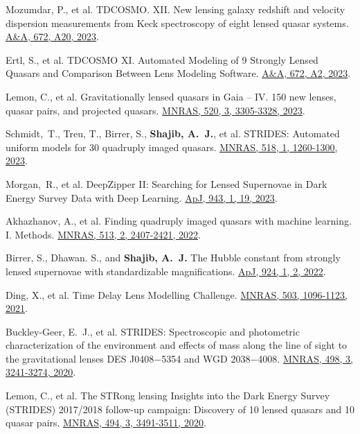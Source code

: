 \documentclass[margin, line]{res}
\begin{document}
\begin{resume}
\begin{etaremune}
	\item Mozumdar, P., et al. TDCOSMO. XII. New lensing galaxy redshift and velocity dispersion measurements from Keck spectroscopy of eight lensed quasar systems. \href{https://ui.adsabs.harvard.edu/abs/2023A\%26A...672A..20M/abstract}{A\&A, 672,  A20, 2023}.
	\item Ertl, S., et al. TDCOSMO XI. Automated Modeling of 9 Strongly Lensed Quasars and Comparison Between Lens Modeling Software. \href{https://ui.adsabs.harvard.edu/abs/2023A\%26A...672A...2E/abstract}{A\&A, 672, A2, 2023}.
	\item Lemon, C., et al. Gravitationally lensed quasars in Gaia -- IV. 150 new lenses, quasar pairs, and projected quasars. \href{https://ui.adsabs.harvard.edu/abs/2023MNRAS.520.3305L/abstract}{MNRAS, 520, 3, 3305-3328, 2023}.
	\item Schmidt,~T., Treu, T., Birrer, S., \textbf{Shajib, A.~J.}, et al. STRIDES: Automated uniform models for 30 quadruply imaged quasars. \href{https://ui.adsabs.harvard.edu/abs/2023MNRAS.518.1260S/abstract}{MNRAS, 518, 1, 1260-1300, 2023}.
	\item Morgan,~R., et al. DeepZipper II: Searching for Lensed Supernovae in Dark Energy Survey Data with Deep Learning. \href{https://ui.adsabs.harvard.edu/abs/2023ApJ...943...19M/abstract}{ApJ, 943, 1, 19, 2023}.
	\item Akhazhanov, A., et al. Finding quadruply imaged quasars with machine learning. I. Methods. \href{https://ui.adsabs.harvard.edu/abs/2022MNRAS.tmp..904A/abstract}{MNRAS, 513, 2, 2407-2421, 2022}.
	\item Birrer, S., Dhawan. S., and \textbf{Shajib, A.~J.} The Hubble constant from strongly lensed supernovae with standardizable magnifications. \href{https://iopscience.iop.org/article/10.3847/1538-4357/ac323a}{ApJ, 924, 1, 2, 2022}.
	\item Ding, X., et al. Time Delay Lens Modelling Challenge. \href{https://ui.adsabs.harvard.edu/abs/2021MNRAS.503.1096D/abstract}{MNRAS, 503, 1096-1123, 2021}.
	\item Buckley-Geer, E.~J., et al. STRIDES: Spectroscopic and photometric characterization of the environment and effects of mass along the line of sight to the gravitational lenses DES J0408$-$5354 and WGD 2038$-$4008. \href{https://ui.adsabs.harvard.edu/abs/2020MNRAS.498.3241B/abstract}{MNRAS, 498, 3, 3241-3274, 2020}.
	\item Lemon, C., et al. The STRong lensing Insights into the Dark Energy Survey (STRIDES) 2017/2018 follow-up campaign: Discovery of 10 lensed quasars and 10 quasar pairs. \href{https://doi.org/10.1093/mnras/staa652}{MNRAS, 494, 3, 3491-3511, 2020}.

\end{etaremune}
\end{resume}
\end{document}
